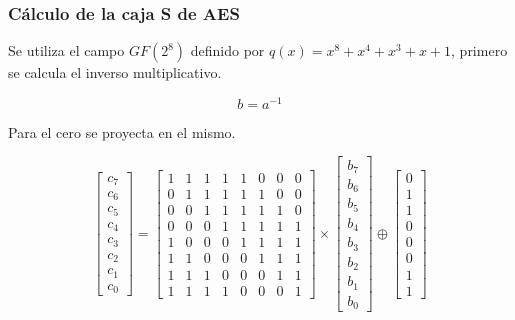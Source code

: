 \documentclass{beamer}
\begin{document}
\frame
{
	\frametitle{Cálculo de la caja S de AES}

Se utiliza el campo $GF(2^8)$ definido por $q(x)=x^8+x^4+x^3+x+1$, primero se calcula el inverso multiplicativo.

$$b=a^{-1}$$

{\color{red} Para el cero se proyecta en el mismo.}


\begin{equation*} 
\begin{bmatrix} 
c_7 \\
c_6 \\
c_5 \\
c_4 \\
c_3 \\
c_2 \\
c_1 \\
c_0
\end{bmatrix}
=
\begin{bmatrix} 
1 & 1 & 1 & 1 & 1 & 0 & 0 & 0 \\
0 & 1 & 1 & 1 & 1 & 1 & 0 & 0 \\
0 & 0 & 1 & 1 & 1 & 1 & 1 & 0 \\
0 & 0 & 0 & 1 & 1 & 1 & 1 & 1 \\
1 & 0 & 0 & 0 & 1 & 1 & 1 & 1 \\
1 & 1 & 0 & 0 & 0 & 1 & 1 & 1 \\
1 & 1 & 1 & 0 & 0 & 0 & 1 & 1 \\ 
1 & 1 & 1 & 1 & 0 & 0 & 0 & 1
\end{bmatrix}
\times
\begin{bmatrix}
b_7 \\
b_6 \\
b_5 \\
b_4 \\
b_3 \\
b_2 \\
b_1 \\
b_0 
\end{bmatrix}
\oplus
\begin{bmatrix}
0 \\
1 \\
1 \\
0 \\
0 \\
0 \\
1 \\
1 
\end{bmatrix}
\end{equation*}

}
\end{document}
